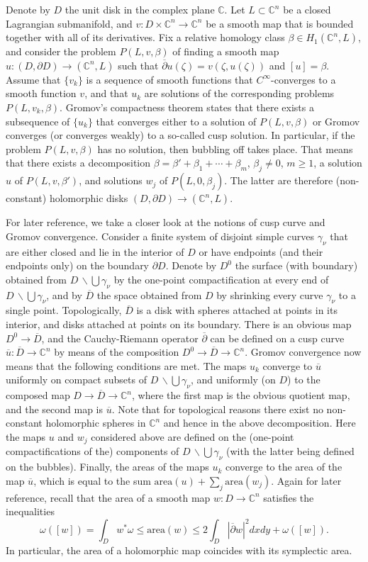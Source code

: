 \documentclass{amsart}
\theoremstyle{remark}
\def\area{{\textrm{area}}}
\def\C{{\mathbb C}}
\def\p{{\partial}}
\def\pbar{{\overline{\partial}}}
\begin{document}
Denote by $D$ the unit disk in the complex plane $\C$.
Let $L \subset \C^n$ be a closed Lagrangian submanifold, and $v \colon D \times \C^n \to \C^n$ be a smooth map that is bounded together with all of its derivatives.
Fix a relative homology class $\beta \in H_1 (\C^n, L)$, and consider the problem $P (L, v, \beta)$ of finding a smooth map $u \colon (D, \p D) \to (\C^n, L)$ such that $\pbar u (\zeta) = v (\zeta, u (\zeta))$ and $[ u ] = \beta$.
Assume that $\{ v_k \}$ is a sequence of smooth functions that $C^\infty$-converges to a smooth function $v$, and that $u_k$ are solutions of the corresponding problems $P (L, v_k, \beta)$.
Gromov's compactness theorem states that there exists a subsequence of $\{ u_k \}$ that converges either to a solution of $P (L, v, \beta)$ or Gromov converges (or converges weakly) to a so-called cusp solution.
In particular, if the problem $P (L, v, \beta)$ has no solution, then bubbling off takes place.
That means that there exists a decomposition $\beta = \beta' + \beta_1 + \cdots + \beta_m$, $\beta_j \not=0$, $m \ge 1$, a solution $u$ of $P (L, v, \beta')$, and solutions $w_j$ of $P (L, 0, \beta_j)$.
The latter are therefore (non-constant) holomorphic disks $(D, \p D) \to (\C^n, L)$.

For later reference, we take a closer look at the notions of cusp curve and Gromov convergence.
Consider a finite system of disjoint simple curves $\gamma_\nu$ that are either closed and lie in the interior of $D$ or have endpoints (and their endpoints only) on the boundary $\p D$.
Denote by $D^0$ the surface (with boundary) obtained from $D \, \backslash \bigcup \gamma_\nu$ by the one-point compactification at every end of $D \, \backslash \bigcup \gamma_\nu$, and by $\overline{D}$ the space obtained from $D$ by shrinking every curve $\gamma_\nu$ to a single point.
Topologically, $\overline{D}$ is a disk with spheres attached at points in its interior, and disks attached at points on its boundary.
There is an obvious map $D^0 \to \overline{D}$, and the Cauchy-Riemann operator $\pbar$ can be defined on a cusp curve $\overline{u} \colon \overline{D} \to \C^n$ by means of the composition $D^0 \to \overline{D} \to \C^n$.
Gromov convergence now means that the following conditions are met.
The maps $u_k$ converge to $\overline{u}$ uniformly on compact subsets of $D \, \backslash \bigcup \gamma_\nu$, and uniformly (on $D$) to the composed map $D \to \overline{D} \to \C^n$, where the first map is the obvious quotient map, and the second map is $\overline{u}$.
Note that for topological reasons there exist no non-constant holomorphic spheres in $\C^n$ and hence in the above decomposition.
Here the maps $u$ and $w_j$ considered above are defined on the (one-point compactifications of the) components of $D \, \backslash \bigcup \gamma_\nu$ (with the latter being defined on the bubbles).
Finally, the areas of the maps $u_k$ converge to the area of the map $\overline{u}$, which is equal to the sum $\area (u) + \sum_j \area (w_j)$.
Again for later reference, recall that the area of a smooth map $w \colon D \to \C^n$ satisfies the inequalities \[ \omega ([w]) = \int_D w^* \omega \le \area (w) \le 2 \int_D | \pbar w |^2 dx dy + \omega ([w]). \]
In particular, the area of a holomorphic map coincides with its symplectic area.
\end{document}
